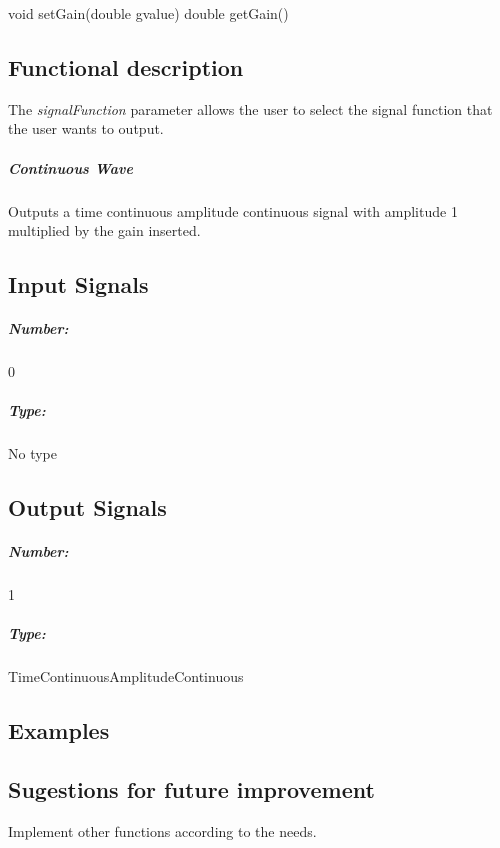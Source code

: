 \bigbreak	
void setGain(double gvalue) 
double getGain() 


\subsection*{Functional description}

The \textit{signalFunction} parameter allows the user to select the signal function that the user wants to output.

\subparagraph*{Continuous Wave}
Outputs a time continuous amplitude continuous signal with amplitude 1 multiplied by the gain inserted.


\subsection*{Input Signals}

\subparagraph*{Number:} 0

\subparagraph*{Type:}No type

\subsection*{Output Signals}

\subparagraph*{Number:} 1 

\subparagraph*{Type:} TimeContinuousAmplitudeContinuous

\subsection*{Examples}


\subsection*{Sugestions for future improvement}

Implement other functions according to the needs.

